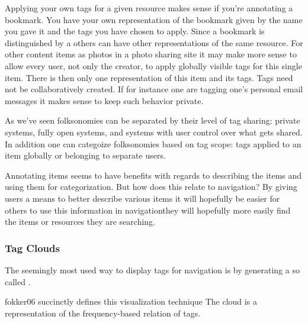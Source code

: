 Applying your own tags for a given resource makes sense if you're annotating a
bookmark. You have your own representation of the bookmark given by the name
you gave it and the tags you have chosen to apply. Since a bookmark is
distinguished by a  others can have other representations of the
same resource. For other content items as photos in a photo sharing site it
may make more sense to allow every user, not only the creator, to apply
globally visible tags for this single item. There is then only one
representation of this item and its tags.
Tags need not be collaboratively created. If for instance one are tagging
one's personal email messages it makes sense to keep such behavior private.

As we've seen folksonomies can be separated by their level of tag sharing:
private systems, fully open systems, and systems with user control over
what gets shared. In addition one can categoize folksonomies based on tag
scope: tags applied to an item globally
or belonging to separate users.%

Annotating items seems to have benefits with regards to describing the items
and using them for categorization. But how does this relate to navigation?
By giving users a means to better describe various items it will hopefully be
easier for others to use this information in navigation\dash{}they will
hopefully more easily find the items or resources they are searching.

\subsubsection{Tag Clouds}

The seemingly most used way to display tags for navigation is by generating
a so called .%
\begin{fullquote}[\p{1}]{fokker06}{%
  succinctly defines this visualization technique}
    The cloud is a representation of the frequency-based relation of tags.
\end{fullquote}

